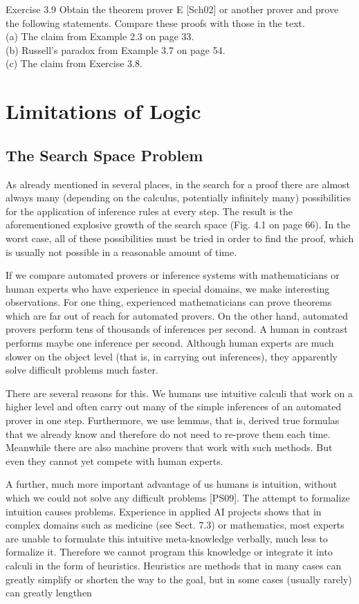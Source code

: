 \documentclass[10pt]{article}
\begin{document}
Exercise 3.9 Obtain the theorem prover E [Sch02] or another prover and prove the following statements. Compare these proofs with those in the text.\\
(a) The claim from Example 2.3 on page 33.\\
(b) Russell's paradox from Example 3.7 on page 54.\\
(c) The claim from Exercise 3.8.

\section*{Limitations of Logic}
\subsection*{The Search Space Problem}
As already mentioned in several places, in the search for a proof there are almost always many (depending on the calculus, potentially infinitely many) possibilities for the application of inference rules at every step. The result is the aforementioned explosive growth of the search space (Fig. 4.1 on page 66). In the worst case, all of these possibilities must be tried in order to find the proof, which is usually not possible in a reasonable amount of time.

If we compare automated provers or inference systems with mathematicians or human experts who have experience in special domains, we make interesting observations. For one thing, experienced mathematicians can prove theorems which are far out of reach for automated provers. On the other hand, automated provers perform tens of thousands of inferences per second. A human in contrast performs maybe one inference per second. Although human experts are much slower on the object level (that is, in carrying out inferences), they apparently solve difficult problems much faster.

There are several reasons for this. We humans use intuitive calculi that work on a higher level and often carry out many of the simple inferences of an automated prover in one step. Furthermore, we use lemmas, that is, derived true formulas that we already know and therefore do not need to re-prove them each time. Meanwhile there are also machine provers that work with such methods. But even they cannot yet compete with human experts.

A further, much more important advantage of us humans is intuition, without which we could not solve any difficult problems [PS09]. The attempt to formalize intuition causes problems. Experience in applied AI projects shows that in complex domains such as medicine (see Sect. 7.3) or mathematics, most experts are unable to formulate this intuitive meta-knowledge verbally, much less to formalize it. Therefore we cannot program this knowledge or integrate it into calculi in the form of heuristics. Heuristics are methods that in many cases can greatly simplify or shorten the way to the goal, but in some cases (usually rarely) can greatly lengthen
\end{document}
